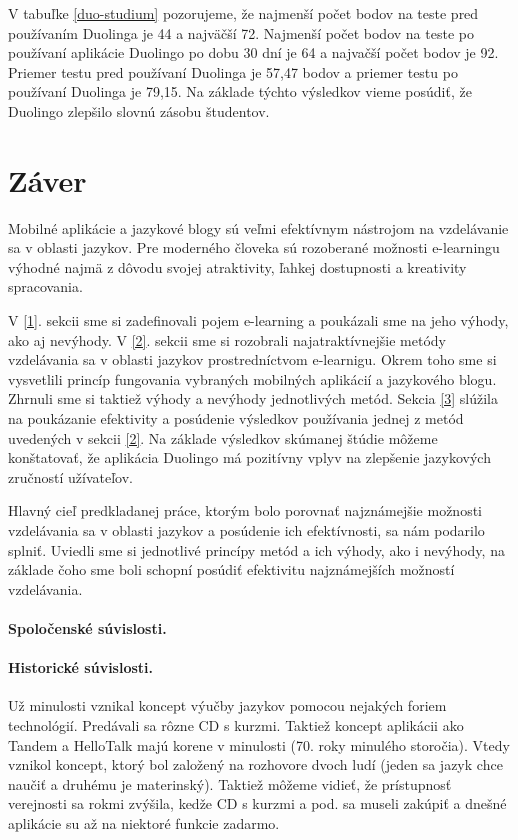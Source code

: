 \documentclass[10pt,oneside,slovak,a4paper]{article}
\begin{document}
V tabuľke \ref{duo-studium} pozorujeme, že najmenší počet bodov na teste pred používaním Duolinga je 44 a najväčší 72. Najmenší počet bodov na teste po používaní aplikácie  Duolingo po dobu 30 dní je 64 a najvačší počet bodov je 92. Priemer testu pred používaní Duolinga je 57,47 bodov a priemer testu po používaní Duolinga je 79,15. \cite{duolingo} Na základe týchto výsledkov vieme posúdiť, že Duolingo zlepšilo slovnú zásobu študentov.

\section*{Záver}
Mobilné aplikácie a jazykové blogy sú veľmi efektívnym nástrojom na vzdelávanie sa v oblasti jazykov. Pre moderného človeka sú rozoberané možnosti e-learningu výhodné najmä z dôvodu svojej atraktivity, ľahkej dostupnosti a kreativity spracovania.

V \ref{1}. sekcii sme si zadefinovali pojem e-learning a poukázali sme na jeho výhody, ako aj nevýhody. V \ref{2}. sekcii sme si rozobrali najatraktívnejšie metódy vzdelávania sa v oblasti jazykov prostredníctvom e-learnigu. Okrem toho sme si vysvetlili princíp fungovania vybraných mobilných aplikácií a jazykového blogu. Zhrnuli sme si taktiež výhody a nevýhody jednotlivých metód. Sekcia \ref{3} slúžila na poukázanie efektivity a posúdenie výsledkov používania jednej z metód uvedených v sekcii \ref{2}. Na základe výsledkov skúmanej štúdie môžeme konštatovať, že aplikácia Duolingo má pozitívny vplyv na zlepšenie jazykových zručností užívateľov. 

Hlavný cieľ predkladanej práce, ktorým bolo porovnať najznámejšie možnosti vzdelávania sa v oblasti jazykov a posúdenie ich efektívnosti, sa nám podarilo splniť. Uviedli sme si jednotlivé princípy metód a ich výhody, ako i nevýhody, na základe čoho sme boli schopní posúdiť efektivitu najznámejších možností vzdelávania.

\paragraph{Spoločenské súvislosti.}
\paragraph{Historické súvislosti.}
Už minulosti vznikal koncept výučby jazykov pomocou nejakých foriem technológií. Predávali sa rôzne CD s kurzmi. Taktiež koncept aplikácii ako Tandem a HelloTalk majú korene v minulosti (70. roky minulého storočia). Vtedy vznikol koncept, ktorý bol založený na rozhovore dvoch ludí (jeden sa jazyk chce naučiť a druhému je materinský). Taktiež môžeme vidieť, že prístupnosť verejnosti sa rokmi zvýšila, kedže CD s kurzmi a pod. sa museli zakúpiť a dnešné aplikácie su až na niektoré funkcie zadarmo.
\end{document}
